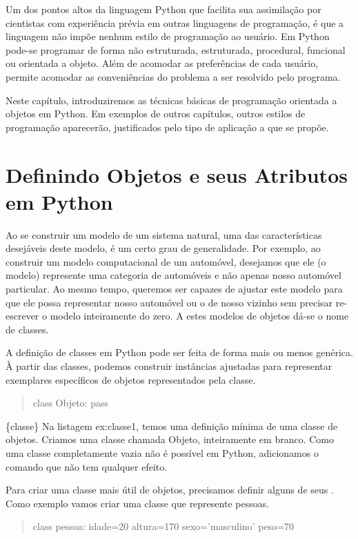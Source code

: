 \documentclass[a4paper,10pt,brazil]{sphinxmanual}
\begin{document}
Um dos pontos altos da linguagem Python que facilita sua
assimilação por cientistas com experiência prévia em outras
linguagens de programação, é que a linguagem não impõe nenhum
estilo de programação ao usuário. Em Python pode-se programar de
forma não estruturada, estruturada, procedural, funcional ou
orientada a objeto. Além de acomodar as preferências de cada
usuário, permite acomodar as conveniências do problema a ser
resolvido pelo programa.

Neste capítulo, introduziremos as técnicas básicas de programação
orientada a objetos em Python. Em exemplos de outros capítulos,
outros estilos de programação aparecerão, justificados pelo tipo de
aplicação a que se propõe.


\section{Definindo Objetos e seus Atributos em Python}
\label{CapObj:definindo-objetos-e-seus-atributos-em-python}
Ao se construir um modelo de um sistema natural, uma das
características desejáveis deste modelo, é um certo grau de
generalidade. Por exemplo, ao construir um modelo computacional de
um automóvel, desejamos que ele (o modelo) represente uma categoria
de automóveis e não apenas nosso automóvel particular. Ao mesmo
tempo, queremos ser capazes de ajustar este modelo para que ele
possa representar nosso automóvel ou o de nosso vizinho sem
precisar re-escrever o modelo inteiramente do zero. A estes modelos
de objetos dá-se o nome de classes.

A definição de classes em Python pode ser feita de forma mais ou
menos genérica. À partir das classes, podemos construir instâncias
ajustadas para representar exemplares específicos de objetos
representados pela classe.
\begin{quote}

class Objeto: pass
\end{quote}

\{classe\} Na listagem ex:classe1, temos uma definição mínima de uma
classe de objetos. Criamos uma classe chamada Objeto, inteiramente
em branco. Como uma classe completamente vazia não é possível em
Python, adicionamos o comando  que não tem qualquer
efeito.

Para criar uma classe mais útil de objetos, precisamos definir
alguns de seus . Como exemplo vamos criar uma classe
que represente pessoas.
\begin{quote}

class pessoa: idade=20 altura=170 sexo='masculino' peso=70
\end{quote}
\end{document}
